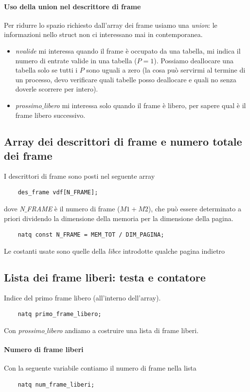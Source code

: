 \documentclass[11pt]{report}
\theoremstyle{definition}
\begin{document}
\paragraph{Uso della union nel descrittore di frame}
Per ridurre lo spazio richiesto dall'array dei frame usiamo una \emph{union}: le informazioni nello struct non ci interessano mai in contemporanea.
\begin{itemize}
	\item \emph{nvalide} mi interessa quando il frame è occupato da una tabella, mi indica il numero di entrate valide in una tabella ($P=1$). Possiamo deallocare una tabella solo se tutti i $P$ sono uguali a zero (la cosa può servirmi al termine di un processo, devo verificare quali tabelle posso deallocare e quali no senza doverle scorrere per intero).
	\item \emph{prossimo$\_$libero} mi interessa solo quando il frame è libero, per sapere qual è il frame libero successivo.
\end{itemize}
\subsection{Array dei descrittori di frame e numero totale dei frame}
I descrittori di frame sono posti nel seguente array
\begin{verbatim}
	des_frame vdf[N_FRAME];
\end{verbatim}
dove \emph{N$\_$FRAME} è il numero di frame ($M1+M2$), che può essere determinato a priori dividendo la dimensione della memoria per la dimensione della pagina.
\begin{verbatim}
	natq const N_FRAME = MEM_TOT / DIM_PAGINA;
\end{verbatim}
Le costanti usate sono quelle della \emph{libce} introdotte qualche pagina indietro
\subsection{Lista dei frame liberi: testa e contatore}
Indice del primo frame libero (all'interno dell'array). 
\begin{verbatim}
	natq primo_frame_libero;
\end{verbatim}Con \emph{prossimo$\_$libero} andiamo a costruire una lista di frame liberi.
\paragraph{Numero di frame liberi}
Con la seguente variabile contiamo il numero di frame nella lista
\begin{verbatim}
	natq num_frame_liberi;
\end{verbatim}
\end{document}
